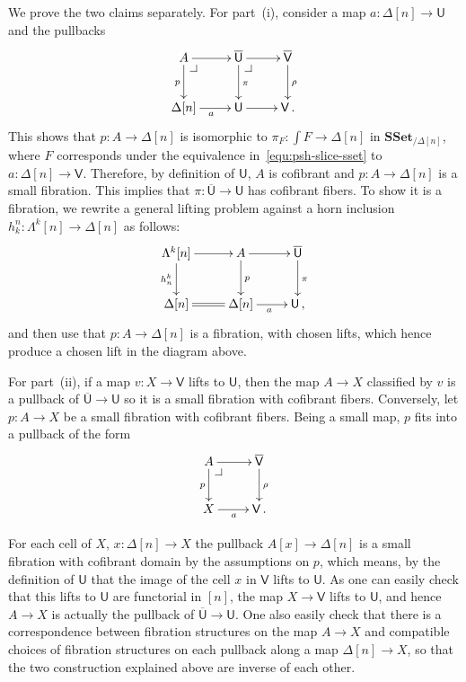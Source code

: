 \documentclass[reqno,10pt,a4paper,oneside,draft]{amsart}
\makeatletter
\renewenvironment{proof}[1][\proofname] {\par\pushQED{\qed}\normalfont\topsep6\p@\@plus6\p@\relax\trivlist\item[\hskip\labelsep\bf#1\@addpunct{.}]\ignorespaces}{\popQED\endtrivlist\@endpefalse}
\numberwithin{equation}{section}
\theoremstyle{mythm}
\theoremstyle{mydef}
\theoremstyle{myrmk}
\newcommand{\pullback}[1]{\save*!/#1-1.2pc/#1:(-1,1)@^{|-}\restore}
\newcommand{\drpullback}{\pullback{dr}}
\newcommand{\co}{\colon}
\newcommand{\SSet}{\mathbf{SSet}}
\newcommand{\UU}{\overline{\mathsf{U}}}
\newcommand{\U}{\mathsf{U}}
\newcommand{\VV}{\overline{\mathsf{V}}}
\newcommand{\V}{\mathsf{V}}
\makeatother
\begin{document}
\begin{proof} We prove the two claims separately.
For part~(i), consider a map $a \co \Delta[n] \rightarrow \U$ and the pullbacks
\[
\xymatrix{
A \ar[r] \ar[d]_p  \drpullback & \UU \ar[d]^{\pi} \ar[r]  \drpullback & \VV \ar[d]^{\rho} \\
\Delta[n] \ar[r]_{a} & \U \ar[r] & \V \, . }
\]
This shows that $p \co A \rightarrow \Delta[n]$ is isomorphic to $\pi_F \co \int F \rightarrow \Delta[n]$ in $\SSet_{/ \Delta[n]}$, where $F$ corresponds under the equivalence in~\eqref{equ:psh-slice-sset} to 
$a \co \Delta[n] \rightarrow \V$. Therefore, by definition of $\U$, $A$ is cofibrant and $p \co A \rightarrow \Delta[n]$ is a small fibration. This implies that $\pi \co \UU \rightarrow \U$ has cofibrant fibers. To show it is a fibration, we rewrite a general lifting problem against a horn inclusion $h^n_k \co \Lambda^k[n] \rightarrow \Delta[n]$ as follows:
\[
\xymatrix{
\Lambda^k[n] \ar[r] \ar[d]_{h^k_n} & A  \ar[d]^{p} \ar[r] & \UU \ar[d]^\pi \\
\Delta[n] \ar@{=}[r]  & \Delta[n] \ar[r]_a & \U \, ,  }
\]
and then use that $p \co A  \to \Delta[n]$ is a fibration, with chosen lifts, which hence produce a chosen lift in the diagram above.

For part~(ii), if a map $v \co X \to \V$ lifts to $\U$, then the map $A \to X$ classified by $v$ is a pullback of $\UU \to \U$ so it is a small fibration with cofibrant fibers. Conversely, let $p \co A \to X$ be a small fibration with cofibrant fibers. Being a small 
map, $p$ fits into a pullback of the form 
\[
\xymatrix{
A \ar[r] \ar[d]_p \drpullback  &  \VV \ar[d]^{\rho} \\
X \ar[r]_{a} & \V \, . }
\]

For each cell of $X$,  $x \co \Delta[n] \rightarrow X$ the pullback $A[x] \rightarrow \Delta[n]$ is a small fibration with cofibrant domain by the assumptions on $p$, which means, by the definition of $\U$ that the image of the cell $x$ in $\V$ lifts to $\U$. As one can easily check that this lifts to $\U$ are functorial in $[n]$, the map $X \rightarrow \V$ lifts to $\U$, and hence $A \rightarrow X$ is actually the pullback of $\UU \rightarrow \U$. One also easily check that there is a correspondence between fibration structures on the map $A \to X$ and compatible choices of fibration structures on each pullback along a map $\Delta[n] \to X$, so that the two construction explained above are inverse of each other. \qedhere
\end{proof} 
\end{document}

